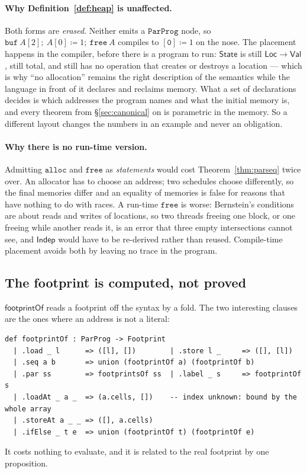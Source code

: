 \documentclass[11pt,a4paper]{article}
\theoremstyle{definition}
\theoremstyle{plain}
\theoremstyle{remark}
\newcommand{\Loc}{\mathsf{Loc}}
\newcommand{\Val}{\mathsf{Val}}
\newcommand{\State}{\mathsf{State}}
\newcommand{\Indep}{\mathsf{Indep}}
\begin{document}
\paragraph{Why Definition~\ref{def:heap} is unaffected.}
Both forms are \emph{erased}. Neither emits a $\texttt{ParProg}$ node, so
$\mathtt{buf}\ A[2];\ A[0] \coloneqq 1;\ \mathtt{free}\ A$ compiles to
$\mathtt{[0]} \coloneqq 1$ on the nose. The placement happens in the compiler, before there
is a program to run: $\State$ is still $\Loc \to \Val$, still total, and still has no
operation that creates or destroys a location --- which is why ``no allocation'' remains the
right description of the semantics while the language in front of it declares and reclaims
memory. What a set of declarations decides is which addresses the program names and what the
initial memory is, and every theorem from \S\ref{sec:canonical} on is parametric in the
memory. So a different layout changes the numbers in an example and never an obligation.

\paragraph{Why there is no run-time version.}
Admitting $\mathtt{alloc}$ and $\mathtt{free}$ as \emph{statements} would cost
Theorem~\ref{thm:parseq} twice over. An allocator has to choose an address; two schedules
choose differently, so the final memories differ and an equality of memories is false for
reasons that have nothing to do with races. A run-time $\mathtt{free}$ is worse: Bernstein's
conditions are about reads and writes of locations, so two threads freeing one block, or one
freeing while another reads it, is an error that three empty intersections cannot see, and
$\Indep$ would have to be re-derived rather than reused. Compile-time placement avoids both
by leaving no trace in the program.

\subsection{The footprint is computed, not proved}\label{sec:lang:fp}

$\mathsf{footprintOf}$ reads a footprint off the syntax by a fold. The two interesting
clauses are the ones where an address is not a literal:
\begin{lstlisting}
def footprintOf : ParProg -> Footprint
  | .load _ l      => ([l], [])        | .store l _     => ([], [l])
  | .seq a b       => union (footprintOf a) (footprintOf b)
  | .par ss        => footprintsOf ss  | .label _ s     => footprintOf s
  | .loadAt _ a _  => (a.cells, [])    -- index unknown: bound by the whole array
  | .storeAt a _ _ => ([], a.cells)
  | .ifElse _ t e  => union (footprintOf t) (footprintOf e)
\end{lstlisting}
It costs nothing to evaluate, and it is related to the real footprint by one proposition.
\end{document}
